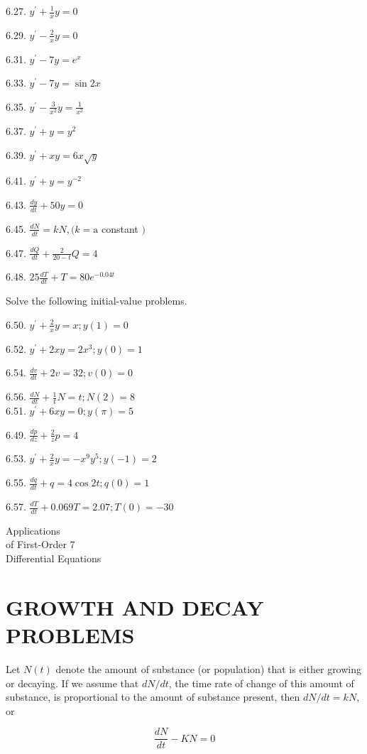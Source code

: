 \documentclass[10pt]{article}
\begin{document}
6.27. $y^{\prime}+\frac{1}{x} y=0$

6.29. $y^{\prime}-\frac{2}{x} y=0$

6.31. $y^{\prime}-7 y=e^{x}$

6.33. $y^{\prime}-7 y=\sin 2 x$

6.35. $y^{\prime}-\frac{3}{x^{2}} y=\frac{1}{x^{2}}$

6.37. $y^{\prime}+y=y^{2}$

6.39. $y^{\prime}+x y=6 x \sqrt{y}$

6.41. $y^{\prime}+y=y^{-2}$

6.43. $\frac{d y}{d t}+50 y=0$

6.45. $\frac{d N}{d t}=k N,(k=\mathrm{a}$ constant $)$

6.47. $\frac{d Q}{d t}+\frac{2}{20-t} Q=4$

6.48. $25 \frac{d T}{d t}+T=80 e^{-0.04 t}$

Solve the following initial-value problems.

6.50. $y^{\prime}+\frac{2}{x} y=x ; y(1)=0$

6.52. $y^{\prime}+2 x y=2 x^{3} ; y(0)=1$

6.54. $\frac{d v}{d t}+2 v=32 ; v(0)=0$

6.56. $\frac{d N}{d t}+\frac{1}{t} N=t ; N(2)=8$\\
6.51. $y^{\prime}+6 x y=0 ; y(\pi)=5$

6.49. $\frac{d p}{d z}+\frac{2}{z} p=4$

6.53. $y^{\prime}+\frac{2}{x} y=-x^{9} y^{5} ; y(-1)=2$

6.55. $\frac{d q}{d t}+q=4 \cos 2 t ; q(0)=1$

6.57. $\frac{d T}{d t}+0.069 T=2.07 ; T(0)=-30$

Applications\\
of First-Order 7\\
Differential Equations

\section*{GROWTH AND DECAY PROBLEMS}
Let $N(t)$ denote the amount of substance (or population) that is either growing or decaying. If we assume that $d N / d t$, the time rate of change of this amount of substance, is proportional to the amount of substance present, then $d N / d t=k N$, or


\begin{equation*}
\frac{d N}{d t}-K N=0 \tag{7.1}
\end{equation*}
\end{document}
